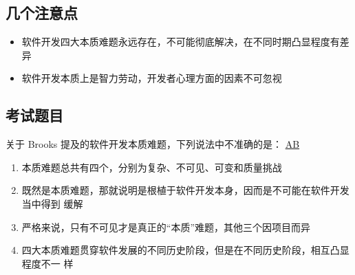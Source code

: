 \subsection{几个注意点}
\begin{itemize}
    \item 软件开发四大本质难题永远存在，不可能彻底解决，在不同时期凸显程度有差异
    \item 软件开发本质上是智力劳动，开发者心理方面的因素不可忽视
\end{itemize}


\subsection{考试题目}
\begin{problem}
	关于 Brooks 提及的软件开发本质难题，下列说法中不准确的是：
	\uline{AB}    
    \begin{enumerate}[label=\Alph*.]
        \item 本质难题总共有四个，分别为复杂、不可见、可变和质量挑战
        \item 既然是本质难题，那就说明是根植于软件开发本身，因而是不可能在软件开发当中得到
            缓解
        \item 严格来说，只有不可见才是真正的“本质”难题，其他三个因项目而异
        \item 四大本质难题贯穿软件发展的不同历史阶段，但是在不同历史阶段，相互凸显程度不一
            样
    \end{enumerate}
\end{problem}

